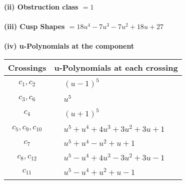 \documentclass[1p]{elsarticle_modified}
\theoremstyle{definition}
\begin{document}
\flushleft \textbf{(ii) Obstruction class $= 1$}\\~\\
\flushleft \textbf{(iii) Cusp Shapes $= 18 u^4-7 u^3-7 u^2+18 u+27$}\\~\\
\newpage\renewcommand{\arraystretch}{1}
\flushleft \textbf{(iv) u-Polynomials at the component}\newline \\
\begin{tabular}{m{50pt}|m{274pt}}
Crossings & \hspace{64pt}u-Polynomials at each crossing \\
\hline $$\begin{aligned}c_{1},c_{2}\end{aligned}$$&$\begin{aligned}
&(u-1)^5
\end{aligned}$\\
\hline $$\begin{aligned}c_{3},c_{6}\end{aligned}$$&$\begin{aligned}
&u^5
\end{aligned}$\\
\hline $$\begin{aligned}c_{4}\end{aligned}$$&$\begin{aligned}
&(u+1)^5
\end{aligned}$\\
\hline $$\begin{aligned}c_{5},c_{9},c_{10}\end{aligned}$$&$\begin{aligned}
&u^5+u^4+4 u^3+3 u^2+3 u+1
\end{aligned}$\\
\hline $$\begin{aligned}c_{7}\end{aligned}$$&$\begin{aligned}
&u^5+u^4- u^2+u+1
\end{aligned}$\\
\hline $$\begin{aligned}c_{8},c_{12}\end{aligned}$$&$\begin{aligned}
&u^5- u^4+4 u^3-3 u^2+3 u-1
\end{aligned}$\\
\hline $$\begin{aligned}c_{11}\end{aligned}$$&$\begin{aligned}
&u^5- u^4+u^2+u-1
\end{aligned}$\\
\hline
\end{tabular}\\~\\
\end{document}
